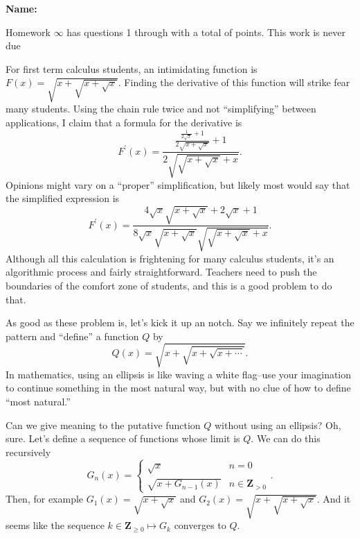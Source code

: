 \documentclass[12pt,fleqn,answers]{exam}
\newcommand{\integers}{\mathbf{Z}}
\newcommand{\quiz}{$\infty$}
\newcommand{\term}{Fall}
\begin{document}
\vspace{0.1in}
\noindent{}
{\bf Name:}  \\
\noindent \makebox[3.0truein][l]{\textbf{Homework \quiz, \term \/ \the\year}}
\vspace{0.1in}

\noindent  Homework \quiz\/  has questions 1 through  \numquestions \/ with a total 
of  \numpoints\/  points. 
This work is never due


\begin{questions}

 \question For first term calculus students, an intimidating function is $F(x) = \sqrt{x + \sqrt{x + \sqrt{x}}}$. Finding the derivative of 
 this function will strike fear many students. Using the chain rule twice and not ``simplifying'' between applications, 
  I claim that a formula for the derivative is
\begin{equation*}
F^\prime(x) = \frac{\frac{\frac{1}{2 \sqrt{x}}+1}{2 \sqrt{x+\sqrt{x}}}+1}{2 \sqrt{\sqrt{x+\sqrt{x}}+x}}.
\end{equation*}
Opinions might vary on a ``proper'' simplification, but likely most would say that the simplified expression is
\begin{equation*}
F^\prime(x) = \frac{4 \sqrt{x} \sqrt{x+\sqrt{x}}+2 \sqrt{x}+1}{8 \sqrt{x} \sqrt{x+\sqrt{x}} \sqrt{\sqrt{x+\sqrt{x}}+x}}.
  \end{equation*}
  Although all this calculation is frightening for many calculus students, it's an algorithmic process and fairly straightforward.  Teachers need to push
  the boundaries of the comfort zone of students, and this is a good problem to do that.
  
  
  \quad As good as these problem is, let's kick it up an notch.  Say we infinitely repeat the pattern and ``define''  a function $Q$ by
  \begin{equation*}
 Q(x) = \sqrt{x + \sqrt{x + \sqrt{x + \cdots}}}.
\end{equation*}
In mathematics, using an ellipsis is like waving a white flag--use your imagination to continue something in the most natural way, 
but with no clue of how to define ``most natural.''  

\quad Can we give meaning to the putative function $Q$ without using an ellipsis?  Oh, sure.  Let's define a sequence of functions whose limit
is $Q$.  We can do this recursively
\begin{equation*}
   G_{n}(x) = \begin{cases}  \sqrt{x}  & n = 0 \\ \sqrt{x + G_{n-1}(x)}  & n \in \integers_{> 0} \end{cases}.
\end{equation*}
Then, for example $G_1(x) = \sqrt{x+\sqrt{x}}$ and $G_2(x) = \sqrt{x+\sqrt{x + \sqrt{x}}}$.   And it seems like
the sequence $k \in \integers_{\geq 0} \mapsto G_k$ converges to $Q$.


\end{questions}
\end{document}

